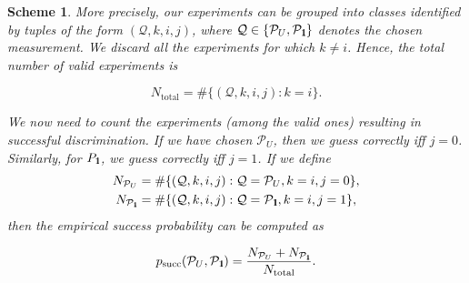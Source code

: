 \documentclass[preprint,12pt, a4paper, dvipsnames]{elsarticle}
\newcommand{\1}{{\rm 1\hspace{-0.9mm}l}}
\newcommand{\Id}{{\rm 1\hspace{-0.9mm}l}}
\newcommand{\PP}{\mathcal{P}}
\newcommand{\QQ}{\mathcal{Q}}
\newtheorem{scheme}{Scheme}
\begin{document}
\begin{scheme}
	More precisely, our experiments can be grouped into classes identified by tuples of the form
	$(\mathcal{Q}, k, i, j)$, where $\mathcal{Q} \in \{\PP_U, \PP_\Id\}$ denotes the chosen measurement.
	We discard all the experiments for which $k \ne i$. Hence, the total number of valid experiments is

	\begin{equation}
	N_\text{total} = \#\{(\QQ, k, i, j): k = i \}.
	\end{equation}

	We now need to count the experiments (among the valid ones) resulting in successful discrimination.
	If we have chosen $\PP_U$, then we guess correctly iff $j=0$. Similarly, for
	$P_\Id$, we guess correctly iff $j=1$. If we define
	\begin{eqnarray}
	N_{\PP_U} &= \#\{(\mathcal{Q}, k, i, j): \mathcal{Q} = \PP_U, k = i, j = 0\}, \\
	N_{\PP_\Id} &= \#\{(\mathcal{Q}, k, i, j): \mathcal{Q} = \PP_\Id, k = i, j = 1\},
	\end{eqnarray}
	then the empirical success probability can be computed as

	\begin{equation}
	p_{\text{succ}}(\PP_{U}, \PP_{\Id}) = \frac{N_{\PP_U} + N_{\PP_\Id}}{N_{\text{total}}}.
	\end{equation}

\end{scheme}
\end{document}
